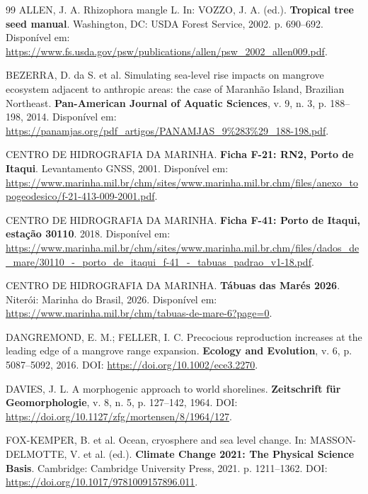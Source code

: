 \documentclass[12pt,a4paper]{article}
\begin{document}
\FloatBarrier
\begin{thebibliography}{99}
ALLEN, J. A. Rhizophora mangle L. In: VOZZO, J. A. (ed.). \textbf{Tropical tree seed manual}. Washington, DC: USDA Forest Service, 2002. p. 690--692. Disponível em: \url{https://www.fs.usda.gov/psw/publications/allen/psw_2002_allen009.pdf}.

BEZERRA, D. da S. et al. Simulating sea-level rise impacts on mangrove ecosystem adjacent to anthropic areas: the case of Maranhão Island, Brazilian Northeast. \textbf{Pan-American Journal of Aquatic Sciences}, v. 9, n. 3, p. 188--198, 2014. Disponível em: \url{https://panamjas.org/pdf_artigos/PANAMJAS_9%283%29_188-198.pdf}.

CENTRO DE HIDROGRAFIA DA MARINHA. \textbf{Ficha F-21: RN2, Porto de Itaqui}. Levantamento GNSS, 2001. Disponível em: \url{https://www.marinha.mil.br/chm/sites/www.marinha.mil.br.chm/files/anexo_topogeodesico/f-21-413-009-2001.pdf}.

CENTRO DE HIDROGRAFIA DA MARINHA. \textbf{Ficha F-41: Porto de Itaqui, estação 30110}. 2018. Disponível em: \url{https://www.marinha.mil.br/chm/sites/www.marinha.mil.br.chm/files/dados_de_mare/30110_-_porto_de_itaqui_f-41_-_tabuas_padrao_v1-18.pdf}.

CENTRO DE HIDROGRAFIA DA MARINHA. \textbf{Tábuas das Marés 2026}. Niterói: Marinha do Brasil, 2026. Disponível em: \url{https://www.marinha.mil.br/chm/tabuas-de-mare-6?page=0}.

DANGREMOND, E. M.; FELLER, I. C. Precocious reproduction increases at the leading edge of a mangrove range expansion. \textbf{Ecology and Evolution}, v. 6, p. 5087--5092, 2016. DOI: \url{https://doi.org/10.1002/ece3.2270}.

DAVIES, J. L. A morphogenic approach to world shorelines. \textbf{Zeitschrift für Geomorphologie}, v. 8, n. 5, p. 127--142, 1964. DOI: \url{https://doi.org/10.1127/zfg/mortensen/8/1964/127}.

FOX-KEMPER, B. et al. Ocean, cryosphere and sea level change. In: MASSON-DELMOTTE, V. et al. (ed.). \textbf{Climate Change 2021: The Physical Science Basis}. Cambridge: Cambridge University Press, 2021. p. 1211--1362. DOI: \url{https://doi.org/10.1017/9781009157896.011}.


\end{thebibliography}
\end{document}
